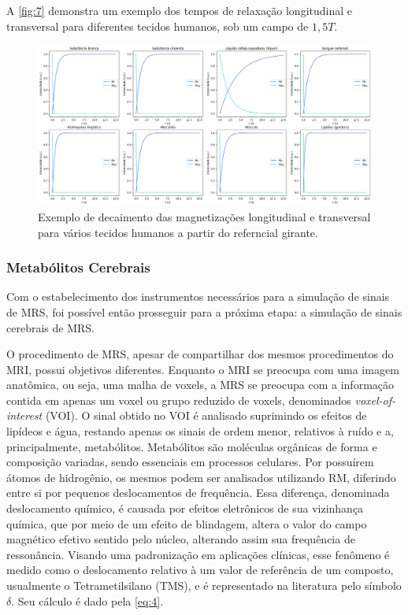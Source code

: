 \documentclass[12pt]{article}
\begin{document}
A \autoref{fig:7} demonstra um exemplo dos tempos de relaxação longitudinal e transversal \cite{Mazzola_2015} para diferentes tecidos humanos, sob um campo de $1,5T$. 

\begin{figure}[H]
    \includegraphics[scale=0.25]{T2.png}
    \centering
    \caption{Exemplo de decaimento das magnetizações longitudinal e transversal para vários tecidos humanos a partir do referncial girante.}
    \label{fig:7}
\end{figure}

\subsubsection{Metabólitos Cerebrais}
\label{sec:metabolites}

Com o estabelecimento dos instrumentos necessários para a simulação de sinais de MRS, foi possível então prosseguir para a próxima etapa:
a simulação de sinais cerebrais de MRS.

O procedimento de MRS, apesar de compartilhar dos mesmos procedimentos do MRI, possui objetivos 
diferentes. Enquanto o MRI se preocupa com uma imagem anatômica, ou seja, uma malha de voxels, a MRS se preocupa com a informação contida em apenas um voxel ou grupo 
reduzido de voxels, denominados \textit{voxel-of-interest} (VOI). O sinal obtido no VOI é analisado suprimindo os efeitos de lipídeos e água, restando 
apenas os sinais de ordem menor, relativos à ruído e a, principalmente, metabólitos. Metabólitos são moléculas orgânicas de forma e composição 
variadas, sendo essenciais em processos celulares. Por possuírem átomos de hidrogênio, os mesmos podem ser analisados utilizando RM, diferindo entre si por pequenos 
deslocamentos de frequência. Essa diferença, denominada deslocamento químico, é causada por efeitos eletrônicos de sua vizinhança química, que por meio de um efeito de blindagem, 
altera o valor do campo magnético efetivo sentido pelo núcleo, alterando assim sua frequência de ressonância. Visando uma padronização em aplicações clínicas, esse fenômeno é medido 
como o deslocamento relativo à um valor de referência de um composto, usualmente o Tetrametilsilano (TMS), e é representado na literatura pelo símbolo $\delta$. Seu cálculo é dado pela \autoref{eq:4}.
\end{document}
